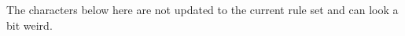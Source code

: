 %
%
%



\


\


\clearpage
{}
The characters below here are not updated to the current rule set and can look a bit weird.

\

